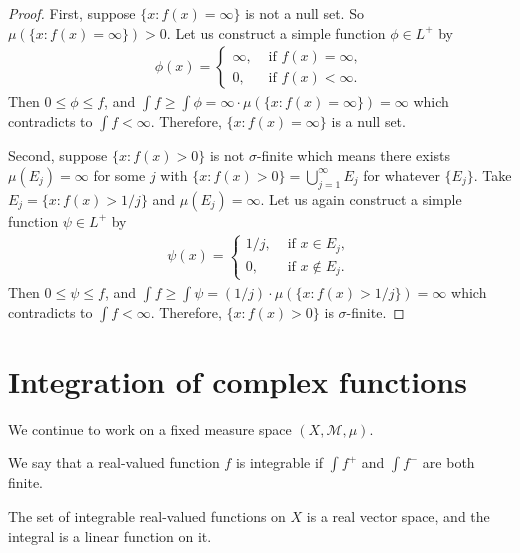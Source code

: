 \begin{proof}
    First, suppose $\{ x : f(x) = \infty \}$ is not a null set.
    So $\mu(\{ x : f(x) = \infty \}) > 0$. 
    Let us construct a simple function $\phi \in L^+$ by
    \begin{align}
        \phi(x) = \begin{cases}
            \infty, & \text{ if } f(x) = \infty, \\
            0, & \text{ if } f(x) < \infty.
        \end{cases}
    \end{align}
    Then $0 \le \phi \le f$, and $\int f \ge \int \phi = \infty \cdot \mu(\{ x : f(x) = \infty \}) = \infty$ which contradicts to $\int f < \infty$.
    Therefore, $\{ x : f(x) = \infty \}$ is a null set.

    Second, suppose $\{ x: f(x) > 0 \}$ is not $\sigma$-finite which means there exists $\mu(E_j) = \infty$ for some $j$ with $\{ x: f(x) > 0 \} = \bigcup_{j=1}^{\infty} E_j$ for whatever $\{ E_j \}$.
    Take $E_j = \{ x: f(x) > 1/j \}$ and $\mu(E_j) = \infty$.
    Let us again construct a simple function $\psi \in L^+$ by
    \begin{align}
        \psi(x) = \begin{cases}
            1/j, & \text{ if } x \in E_j, \\
            0, & \text{ if } x \notin E_j.
        \end{cases}
    \end{align} 
    Then $0 \le \psi \le f$, and $\int f \ge \int \psi = (1/j) \cdot \mu(\{ x : f(x) > 1/j \}) = \infty$ which contradicts to $\int f < \infty$.
    Therefore, $\{ x: f(x) > 0 \}$ is $\sigma$-finite.
\end{proof}

\section{Integration of complex functions}

We continue to work on a fixed measure space $(X, \mathcal{M}, \mu)$.


\begin{definition}
    We say that a real-valued function $f$ is integrable if $\int f^+$ and $\int f^-$ are both finite.
\end{definition}

\begin{proposition}
    The set of integrable real-valued functions on $X$ is a real vector space, and the integral is a linear function on it. 
\end{proposition}

